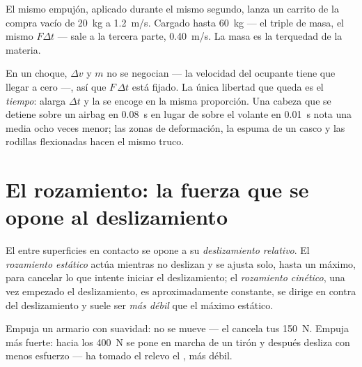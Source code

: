 \begin{example}\label{ex:g11:forces-and-motion:cart}
El mismo empujón, aplicado durante el mismo segundo, lanza un carrito de
la compra vacío de \qty{20}{kg} a \qty{1.2}{m/s}. Cargado hasta
\qty{60}{kg} --- el triple de masa, el mismo $F\Delta t$ --- sale a la
tercera parte, \qty{0.40}{m/s}. La masa es la terquedad de la materia.
\end{example}

\begin{remark}\label{rem:g11:forces-and-motion:airbag}
En un choque, $\Delta v$ y $m$ no se negocian --- la velocidad del
ocupante tiene que llegar a cero ---, así que $F\,\Delta t$ está fijado.
La única libertad que queda es el \emph{tiempo}: alarga $\Delta t$ y la
 se encoge en la misma proporción. Una cabeza que se detiene sobre
un airbag en \qty{0.08}{s} en lugar de sobre el volante en
\qty{0.01}{s} nota una  media ocho veces menor; las zonas de
deformación, la espuma de un casco y las rodillas flexionadas hacen el
mismo truco.
\end{remark}

\section{El rozamiento: la fuerza que se opone al deslizamiento}

\begin{definition}\label{def:g11:forces-and-motion:friction}
El  entre superficies en contacto se opone a su
\emph{deslizamiento relativo}. El \emph{rozamiento
estático} actúa mientras no deslizan y se
ajusta solo, hasta un máximo, para cancelar lo que intente iniciar el
deslizamiento; el \emph{rozamiento
cinético}, una vez empezado el
deslizamiento, es aproximadamente constante, se dirige en contra del
deslizamiento y suele ser \emph{más débil} que el máximo estático.
\end{definition}

\begin{example}\label{ex:g11:forces-and-motion:wardrobe}
Empuja un armario con suavidad: no se mueve --- el 
cancela tus \qty{150}{N}. Empuja más fuerte: hacia los \qty{400}{N} se
pone en marcha de un tirón y después desliza con menos esfuerzo --- ha
tomado el relevo el , más débil.
\end{example}

